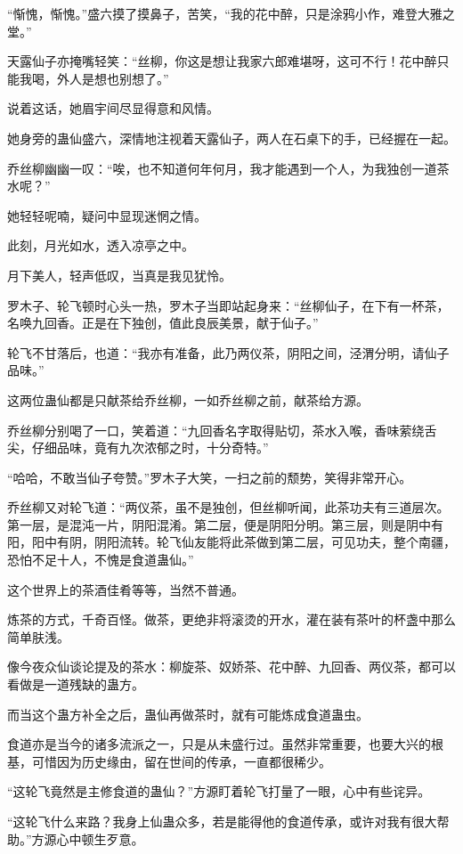 \begin{this_body}
“惭愧，惭愧。”盛六摸了摸鼻子，苦笑，“我的花中醉，只是涂鸦小作，难登大雅之堂。”

天露仙子亦掩嘴轻笑：“丝柳，你这是想让我家六郎难堪呀，这可不行！花中醉只能我喝，外人是想也别想了。”

说着这话，她眉宇间尽显得意和风情。

她身旁的蛊仙盛六，深情地注视着天露仙子，两人在石桌下的手，已经握在一起。

乔丝柳幽幽一叹：“唉，也不知道何年何月，我才能遇到一个人，为我独创一道茶水呢？”

她轻轻呢喃，疑问中显现迷惘之情。

此刻，月光如水，透入凉亭之中。

月下美人，轻声低叹，当真是我见犹怜。

罗木子、轮飞顿时心头一热，罗木子当即站起身来：“丝柳仙子，在下有一杯茶，名唤九回香。正是在下独创，值此良辰美景，献于仙子。”

轮飞不甘落后，也道：“我亦有准备，此乃两仪茶，阴阳之间，泾渭分明，请仙子品味。”

这两位蛊仙都是只献茶给乔丝柳，一如乔丝柳之前，献茶给方源。

乔丝柳分别喝了一口，笑着道：“九回香名字取得贴切，茶水入喉，香味萦绕舌尖，仔细品味，竟有九次浓郁之时，十分奇特。”

“哈哈，不敢当仙子夸赞。”罗木子大笑，一扫之前的颓势，笑得非常开心。

乔丝柳又对轮飞道：“两仪茶，虽不是独创，但丝柳听闻，此茶功夫有三道层次。第一层，是混沌一片，阴阳混淆。第二层，便是阴阳分明。第三层，则是阴中有阳，阳中有阴，阴阳流转。轮飞仙友能将此茶做到第二层，可见功夫，整个南疆，恐怕不足十人，不愧是食道蛊仙。”

这个世界上的茶酒佳肴等等，当然不普通。

炼茶的方式，千奇百怪。做茶，更绝非将滚烫的开水，灌在装有茶叶的杯盏中那么简单肤浅。

像今夜众仙谈论提及的茶水：柳旋茶、奴娇茶、花中醉、九回香、两仪茶，都可以看做是一道残缺的蛊方。

而当这个蛊方补全之后，蛊仙再做茶时，就有可能炼成食道蛊虫。

食道亦是当今的诸多流派之一，只是从未盛行过。虽然非常重要，也要大兴的根基，可惜因为历史缘由，留在世间的传承，一直都很稀少。

“这轮飞竟然是主修食道的蛊仙？”方源盯着轮飞打量了一眼，心中有些诧异。

“这轮飞什么来路？我身上仙蛊众多，若是能得他的食道传承，或许对我有很大帮助。”方源心中顿生歹意。


\end{this_body}
